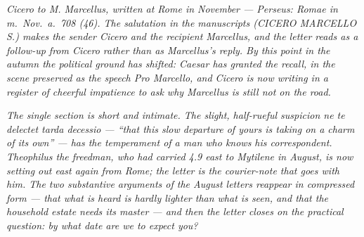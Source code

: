 
\textit{Cicero to M. Marcellus, written at Rome in November ---
Perseus: \textit{Romae in m.~Nov.~a.~708 (46)}. The salutation
in the manuscripts (\textit{CICERO MARCELLO S.}) makes the
sender Cicero and the recipient Marcellus, and the letter reads
as a follow-up from Cicero rather than as Marcellus's reply.
By this point in the autumn the political ground has shifted:
Caesar has granted the recall, in the scene preserved as the
speech \textit{Pro Marcello}, and Cicero is now writing in a
register of cheerful impatience to ask why Marcellus is still
not on the road.}

\textit{The single section is short and intimate. The slight,
half-rueful suspicion \textit{ne te delectet tarda decessio} ---
\enquote{that this slow departure of yours is taking on a charm
of its own} --- has the temperament of a man who knows his
correspondent. Theophilus the freedman, who had carried 4.9 east
to Mytilene in August, is now setting out east again from Rome;
the letter is the courier-note that goes with him. The two
substantive arguments of the August letters reappear in
compressed form --- that what is heard is hardly lighter than
what is seen, and that the household estate needs its master ---
and then the letter closes on the practical question: by what
date are we to expect you?}
